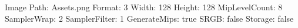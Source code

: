 Image Path: Assets\Textures\Light.png
Format: 3
Width: 128
Height: 128
MipLevelCount: 8
SamplerWrap: 2
SamplerFilter: 1
GenerateMips: true
SRGB: false
Storage: false